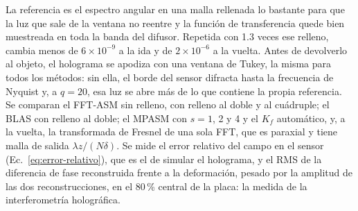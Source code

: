 La referencia es el espectro angular en una malla rellenada lo bastante para
que la luz que sale de la ventana no reentre y la función de transferencia
quede bien muestreada en toda la banda del difusor. Repetida con 1.3 veces ese
relleno, cambia menos de $6\times10^{-9}$ a la ida y de $2\times10^{-6}$ a la
vuelta. Antes de devolverlo al objeto, el holograma se apodiza con una ventana
de Tukey, la misma para todos los métodos: sin ella, el borde del sensor
difracta hasta la frecuencia de Nyquist y, a $q = 20$, esa luz se abre más de
lo que contiene la propia referencia. Se comparan el FFT-ASM sin relleno, con
relleno al doble y al cuádruple; el BLAS con relleno al doble; el MPASM con
$s = 1$, 2 y 4 y el $K_f$ automático, y, a la vuelta, la transformada de
Fresnel de una sola FFT, que es paraxial y tiene malla de salida
$\lambda z/(N\delta)$. Se mide el error relativo del campo en el sensor
(Ec.~\eqref{eq:error-relativo}), que es el de simular el holograma, y el RMS de
la diferencia de fase reconstruida frente a la deformación, pesado por la
amplitud de las dos reconstrucciones, en el 80\,\% central de la placa: la
medida de la interferometría holográfica.

